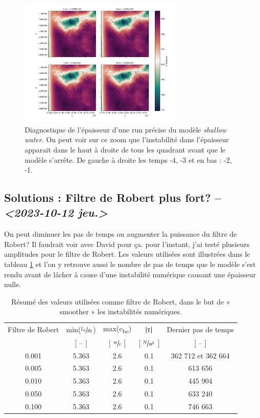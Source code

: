 \documentclass[10pt]{article}
\numberwithin{equation}{section}
\begin{document}
\begin{figure}[!htpb]
\centering
\includegraphics[width=0.7\textwidth]{figures/debuggage/2023_10_08_thickness1_last4steps.png}
\caption{\label{fig:org39f0ff3}Diagnostique de l'épaisseur d'une run précise du modèle \emph{shallow water}. On peut voir sur ce zoom que l'instabilité dans l'épaisseur apparait dans le haut à droite de tous les quadrant avant que le modèle s'arrête. De gauche à droite les temps -4, -3 et en bas : -2, -1.}
\end{figure}

\subsection{Solutions : Filtre de Robert plus fort? -- \textit{<2023-10-12 jeu.>}}
\label{sec:org6522252}
On peut diminuer les pas de temps ou augmenter la puissance du filtre de Robert?
Il faudrait voir avec David pour ça.
pour l'instant, j'ai testé plusieurs amplitudes pour le filtre de Robert.
Les valeurs utilisées sont illustrées dans le tableau \ref{tab:orga20965a} et l'on y retrouve aussi le nombre de pas de temps que le modèle s'est rendu avant de lâcher à cause d'une instabilité numérique causant une épaisseur nulle. 

\begin{table}[htbp]
\caption{\label{tab:orga20965a}Résumé des valeurs utilisées comme filtre de Robert, dans le but de « smoother » les instabilités numériques.}
\centering
\begin{tabular}{ccccc}
\hline
Filtre de Robert & min(\(\sfrac{L_d}{dx}\)) & max(c\textsubscript{bc}) & \(\abs{\vb{\tau}}\) & Dernier pas de temps\\[0pt]
[ -- ] & [ -- ] & [ \(\sfrac{m}{s}\) ] & [ \(\sfrac{N}{m^2}\) ] & [ -- ]\\[0pt]
\hline
\hline
0.001 & 5.363 & 2.6 & 0.1 & 362 712 et 362 664\\[0pt]
0.005 & 5.363 & 2.6 & 0.1 & 613 656\\[0pt]
0.010 & 5.363 & 2.6 & 0.1 & 445 904\\[0pt]
0.050 & 5.363 & 2.6 & 0.1 & 633 240\\[0pt]
0.100 & 5.363 & 2.6 & 0.1 & 746 663\\[0pt]
\hline
\hline
\end{tabular}
\end{table}
\end{document}
